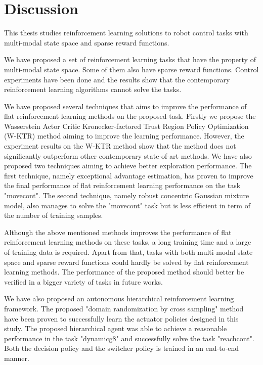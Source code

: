 \chapter{Discussion}
This thesis studies reinforcement learning solutions to robot control tasks with multi-modal state space and sparse reward functions.

We have proposed a set of reinforcement learning tasks that have the property of multi-modal state space. Some of them also have sparse reward functions. Control experiments have been done and the results show that the contemporary reinforcement learning algorithms cannot solve the tasks.

We have proposed several techniques that aims to improve the performance of flat reinforcement learning methods on the proposed task. Firstly we propose the Wasserstein Actor Critic Kronecker-factored Trust Region Policy Optimization (W-KTR) method aiming to improve the learning performance. However, the experiment results on the W-KTR method show that the method does not significantly outperform other contemporary state-of-art methods. We have also proposed two techniques aiming to achieve better exploration performance. The first technique, namely exceptional advantage estimation, has proven to improve the final performance of flat reinforcement learning performance on the task "movecont". The second technique, namely robust concentric Gaussian mixture model, also manages to solve the "movecont" task but is less efficient in term of the number of training samples. 

Although the above mentioned methods improves the performance of flat reinforcement learning methods on these tasks, a long training time and a large of training data is required. Apart from that, tasks with both multi-modal state space and sparse reward functions could hardly be solved by flat reinforcement learning methods. The performance of the proposed method should better be verified in a bigger variety of tasks in future works.

We have also proposed an autonomous hierarchical reinforcement learning framework. The proposed "domain randomization by cross sampling" method have been proven to successfully learn the actuator policies designed in this study. The proposed hierarchical agent was able to achieve a reasonable performance in the task "dynamicg8" and successfully solve the task "reachcont". Both the decision policy and the switcher policy is trained in an end-to-end manner. 

